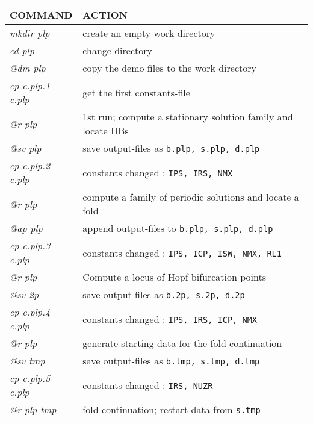 \documentclass[12pt]{report}
\begin{document}
\begin{table}[htbp]
\begin{center}
\begin{tabular}{| l | l |}
\hline
  COMMAND  & ACTION \\
\hline
  {\it mkdir plp} & create an empty work directory \\ 
  {\it cd plp} & change directory \\
  {\it @dm plp} & copy the demo files to the work directory \\
\hline
  {\it cp c.plp.1 c.plp} & get the first constants-file \\ 
  {\it @r plp} & 1st run; compute a stationary solution family and locate HBs \\ 
  {\it @sv plp} & save output-files as {\tt b.plp, s.plp, d.plp} \\ 
\hline
  {\it cp c.plp.2 c.plp} & constants changed : {\tt IPS, IRS, NMX} \\ 
  {\it @r plp} & compute a family of periodic solutions and locate a fold \\ 
  {\it @ap plp} & append output-files to {\tt b.plp, s.plp, d.plp} \\ 
\hline
  {\it cp c.plp.3 c.plp} & constants changed : {\tt IPS, ICP, ISW, NMX, RL1} \\ 
  {\it @r plp} & Compute a locus of Hopf bifurcation points \\ 
  {\it @sv 2p} & save output-files as {\tt b.2p, s.2p, d.2p} \\ 
\hline
  {\it cp c.plp.4 c.plp} & constants changed : {\tt IPS, IRS, ICP, NMX} \\ 
  {\it @r plp} & generate starting data for the fold continuation \\ 
  {\it @sv tmp} & save output-files as {\tt b.tmp, s.tmp, d.tmp} \\ 
\hline
  {\it cp c.plp.5 c.plp} & constants changed : {\tt IRS, NUZR} \\ 
  {\it @r plp tmp} &  fold continuation; restart data from {\tt s.tmp} \\ 

\end{tabular}
\end{center}
\end{table}
\end{document}
